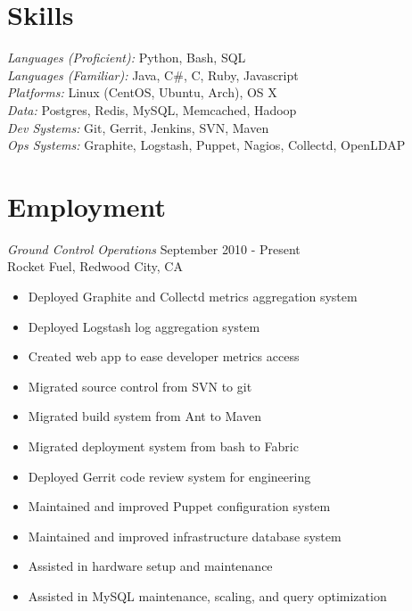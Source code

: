 \documentclass[line,margin]{res}
\begin{document}
\address{Sunnyvale, CA 94087}
\address{\sl tabletcorry@gmail.com}

\begin{resume}
 
\section{Skills} {\sl Languages (Proficient):} Python, Bash, SQL\\
                {\sl Languages (Familiar):} Java, C\#, C, Ruby, Javascript\\
                {\sl Platforms:} Linux (CentOS, Ubuntu, Arch), OS X\\
                {\sl Data:} Postgres, Redis, MySQL, Memcached, Hadoop\\
                {\sl Dev Systems:} Git, Gerrit, Jenkins, SVN, Maven\\
                {\sl Ops Systems:} Graphite, Logstash, Puppet, Nagios, Collectd, OpenLDAP
 
\section{Employment} 
                {\sl Ground Control Operations} \hfill September 2010 - Present \\
                Rocket Fuel, Redwood City, CA
                \begin{itemize}  \itemsep -2pt
                 \item Deployed Graphite and Collectd metrics aggregation system
                 \item Deployed Logstash log aggregation system
                 \item Created web app to ease developer metrics access
                 \item Migrated source control from SVN to git
                 \item Migrated build system from Ant to Maven
                 \item Migrated deployment system from bash to Fabric
                 \item Deployed Gerrit code review system for engineering
                 \item Maintained and improved Puppet configuration system
                 \item Maintained and improved infrastructure database system
                 \item Assisted in hardware setup and maintenance
                 \item Assisted in MySQL maintenance, scaling, and query optimization
                \end{itemize}


\end{resume}
\end{document}

